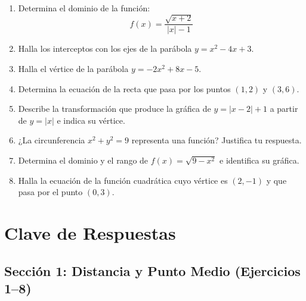 \documentclass[12pt, letterpaper]{article}
\begin{document}
\begin{enumerate}[resume=ejercicios, leftmargin=*]
  \item \muyDificil{} Determina el dominio de la función:
        $$f(x) = \frac{\sqrt{x + 2}}{|x| - 1}$$

  \item \facil{} Halla los interceptos con los ejes de la parábola $y = x^2 - 4x + 3$.

  \item \medio{} Halla el vértice de la parábola $y = -2x^2 + 8x - 5$.

  \item \medio{} Determina la ecuación de la recta que pasa por los puntos $(1, 2)$ y $(3, 6)$.

  \item \medio{} Describe la transformación que produce la gráfica de $y = |x - 2| + 1$ a partir de $y = |x|$ e indica su vértice.

  \item \dificil{} ¿La circunferencia $x^2 + y^2 = 9$ representa una función? Justifica tu respuesta.

  \item \dificil{} Determina el dominio y el rango de $f(x) = \sqrt{9 - x^2}$ e identifica su gráfica.

  \item \muyDificil{} Halla la ecuación de la función cuadrática cuyo vértice es $(2, -1)$ y que pasa por el punto $(0, 3)$.
\end{enumerate}
\newpage
\ifmwclaves
  \section{Clave de Respuestas}

  \subsection*{Sección 1: Distancia y Punto Medio (Ejercicios 1--8)}
\end{document}

